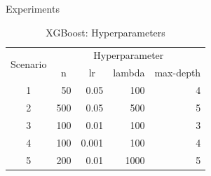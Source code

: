\documentclass[final]{beamer}
\newlength{\colwidth}
\begin{document}
\begin{frame}[t]
\begin{columns}[t]
\begin{column}{\colwidth}
\begin{block}{Experiments}

    \begin{table}[htbp]
        \centering
        \caption{XGBoost: Hyperparameters}
        \label{your-label}
        \begin{tabular}{@{}crrrr@{}}
        \toprule
        \multirow{2}{*}{Scenario} & \multicolumn{4}{c}{Hyperparameter} \\
        \cmidrule(lr){2-5}
        & \multicolumn{1}{c}{n} & \multicolumn{1}{c}{lr} & \multicolumn{1}{c}{lambda} & \multicolumn{1}{c}{max-depth} \\
        \midrule
        1 & 50 & 0.05 & 100 & 4 \\
        2 & 500 & 0.05 & 500 & 5 \\
        3 & 100 & 0.01 & 100 & 3 \\
        4 & 100 & 0.001 & 100 & 4 \\
        5 & 200 & 0.01 & 1000 & 5 \\
        \bottomrule
        \end{tabular}
    \end{table}



\end{block}
\end{column}
\end{columns}
\end{frame}
\end{document}
